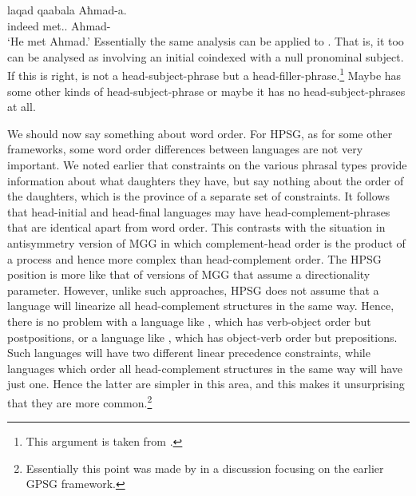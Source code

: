 \documentclass[output=paper]{langsci/langscibook}
\begin{document}
\ea\label{ex:key:4.29}
    \sn\gll laqad    qaabala    Aħmad-a.\\
            indeed met.\Tsg.\M{} Ahmad-\Acc{}\\
    \glt    \enquote*{He met Ahmad.}
\z
%
Essentially the same analysis can be applied to . That is, it
too can be analysed as involving an initial  coindexed with a null
pronominal subject. If this is right,  is not a
head-subject-phrase but a head-filler-phrase.\footnote{ \textrm{This argument
is taken from \citet{AloBor2013}.}} Maybe  has some other kinds of
head-subject-phrase or maybe it has no head-subject-phrases at all.

We should now say something about word order. For \gls{HPSG}, as for some other
frameworks, some word order differences between languages are not very
important. We noted earlier that constraints on the various phrasal types
provide information about what daughters they have, but say nothing about the
order of the daughters, which is the province of a separate set of constraints.
It follows that head-initial and head-final languages may have
head-complement-phrases that are identical apart from word order. This
contrasts with the situation in  antisymmetry version of
\gls{MGG} in which complement-head order is the product of a  process
and hence more complex than head-complement order. The \gls{HPSG} position is more
like that of versions of \gls{MGG} that assume a directionality parameter.
However, unlike such approaches, \gls{HPSG} does not assume that a language will
linearize all head-complement structures in the same way. Hence, there is no
problem with a language like , which has verb-object order but
postpositions, or a language like , which has object-verb order but
prepositions. Such languages will have two different linear precedence
constraints, while languages which order all head-complement structures in the
same way will have just one. Hence the latter are simpler in this area, and
this makes it unsurprising that they are more common.\footnote{Essentially this
point was made by \citet{FodCra1990} in a discussion focusing on the
earlier \gls{GPSG} framework.}
\end{document}
